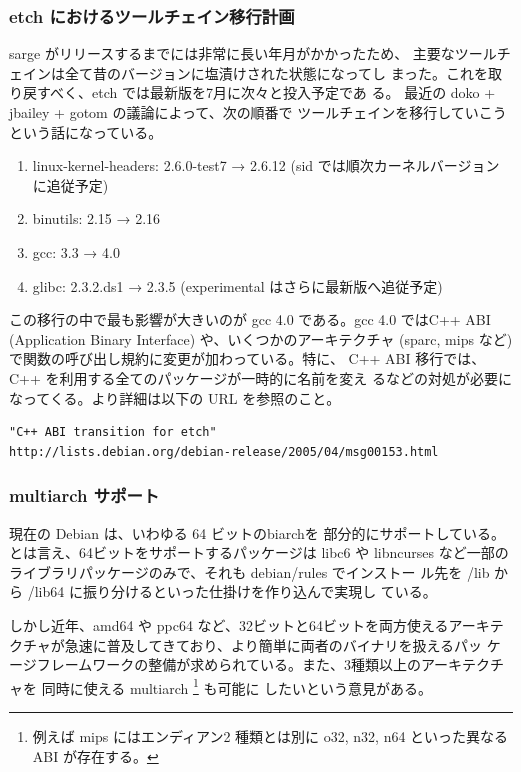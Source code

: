 \documentclass[mingoth]{jsarticle}
\begin{document}
  \subsubsection{etch におけるツールチェイン移行計画}

    sarge がリリースするまでには非常に長い年月がかかったため、
    主要なツールチェインは全て昔のバージョンに塩漬けされた状態になってし
    まった。これを取り戻すべく、etch では最新版を7月に次々と投入予定であ
    る。
    最近の doko + jbailey + gotom の議論によって、次の順番で
    ツールチェインを移行していこうという話になっている。

	\begin{enumerate}
	 \item linux-kernel-headers: 2.6.0-test7 → 2.6.12 (sid では順次カーネルバージョンに追従予定)
	 \item binutils: 2.15 → 2.16
	 \item gcc: 3.3 → 4.0
	 \item glibc: 2.3.2.ds1 → 2.3.5 (experimental はさらに最新版へ追従予定)
	\end{enumerate}

    この移行の中で最も影響が大きいのが gcc 4.0 である。gcc 4.0 ではC++
    ABI (Application Binary Interface) や、いくつかのアーキテクチャ 
    (sparc, mips など) で関数の呼び出し規約に変更が加わっている。特に、
    C++ ABI 移行では、C++ を利用する全てのパッケージが一時的に名前を変え
    るなどの対処が必要になってくる。より詳細は以下の URL を参照のこと。

\begin{Verbatim}[frame=single]
"C++ ABI transition for etch"
http://lists.debian.org/debian-release/2005/04/msg00153.html 
\end{Verbatim}

  \subsubsection{multiarch サポート}

    現在の Debian は、いわゆる 64 ビットのbiarchを
    部分的にサポートしている。とは言え、64ビットをサポートするパッケージは
    libc6 や libncurses など一部のライブラリパッケージのみで、それも
    debian/rules でインストー
    ル先を /lib から /lib64 に振り分けるといった仕掛けを作り込んで実現し
    ている。
    
    しかし近年、amd64 や ppc64 など、32ビットと64ビットを両方使えるアーキテ
    クチャが急速に普及してきており、より簡単に両者のバイナリを扱えるパッ
    ケージフレームワークの整備が求められている。また、3種類以上のアーキテクチャを
    同時に使える multiarch \footnote{例えば mips にはエンディアン2
    種類とは別に o32, n32, n64 といった異なる ABI が存在する。} も可能に
    したいという意見がある。
\end{document}

